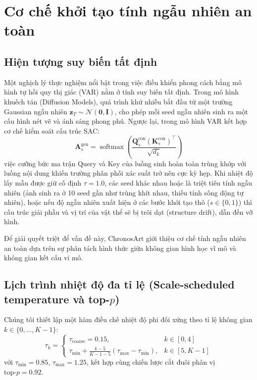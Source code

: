 \documentclass[10pt,twocolumn,letterpaper]{article}
\begin{document}
\section{Cơ chế khởi tạo tính ngẫu nhiên an toàn}
\label{sec:stochasticity}

\subsection{Hiện tượng suy biến tất định}
Một nghịch lý thực nghiệm nổi bật trong việc điều khiển phong cách bằng mô hình tự hồi quy thị giác (VAR) nằm ở tính suy biến tất định. Trong mô hình khuếch tán (Diffusion Models), quá trình khử nhiễu bắt đầu từ một trường Gaussian ngẫu nhiên $\mathbf{z}_T \sim \mathcal{N}(\mathbf{0}, \mathbf{I})$, cho phép mỗi seed ngẫu nhiên sinh ra một cấu hình nét vẽ và ánh sáng phong phú. Ngược lại, trong mô hình VAR kết hợp cơ chế kiểm soát cấu trúc SAC:
\begin{equation}
\mathbf{A}_s^{\text{gen}} = \operatorname{softmax}\left(\frac{\mathbf{Q}_s^{\text{con}} (\mathbf{K}_s^{\text{con}})^\top}{\sqrt{d_k}}\right)
\end{equation}
việc cưỡng bức ma trận Query và Key của luồng sinh hoàn toàn trùng khớp với luồng nội dung khiến trường phân phối xác suất trở nên cực kỳ hẹp. Khi nhiệt độ lấy mẫu được giữ cố định $\tau = 1.0$, các seed khác nhau hoặc là triệt tiêu tính ngẫu nhiên (ảnh sinh ra ở 10 seed gần như trùng khít nhau, thiếu tính sống động tự nhiên), hoặc nếu độ ngẫu nhiên xuất hiện ở các bước khởi tạo thô ($s \in \{0, 1\}$) thì cấu trúc giải phẫu và vị trí của vật thể sẽ bị trôi dạt (structure drift), dẫn đến vỡ hình.

Để giải quyết triệt để vấn đề này, ChronosArt giới thiệu cơ chế tính ngẫu nhiên an toàn dựa trên sự phân tách hình thức giữa không gian hình học vĩ mô và không gian kết cấu vi mô.

\subsection{Lịch trình nhiệt độ đa tỉ lệ (Scale-scheduled temperature và top-$p$)}
Chúng tôi thiết lập một hàm điều chế nhiệt độ phi đối xứng theo tỉ lệ không gian $k \in \{0, \dots, K-1\}$:
\begin{equation}
\tau_k = \begin{cases}
\tau_{\text{coarse}} = 0.15, & k \in [0, 4] \\
\tau_{\text{min}} + \frac{k - 5}{K - 1 - 5} (\tau_{\text{max}} - \tau_{\text{min}}), & k \in [5, K-1]
\end{cases}
\end{equation}
với $\tau_{\text{min}} = 0.85$, $\tau_{\text{max}} = 1.25$, kết hợp cùng chiến lược cắt đuôi phân vị $\text{top-}p = 0.92$.
\end{document}
